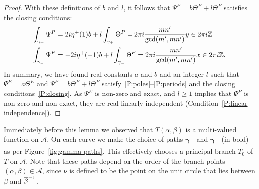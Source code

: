\documentclass{article}
\begin{document}
\begin{lem}
\begin{proof}
With these definitions of $b$ and $l$, it follows that $\Psi^P = b \Theta^E + l \Theta^P$ satisfies the closing conditions:
\begin{align*}
\int_{\gamma_+} \Psi^P
&= 2i \eta^+(1) b + l \int_{\gamma_+} \Theta^P
= 2\pi i \frac{mn'}{\gcd(m',mn')}y \in 2\pi i \mathbb{Z} \\
\int_{\gamma_-} \Psi^P
&= -2i \eta^+(-1) b + l \int_{\gamma_-} \Theta^P
= 2\pi i \frac{mn'}{\gcd(m',mn')}x \in 2\pi i \mathbb{Z}.
\end{align*}
In summary, we have found real constants $a$ and $b$ and an integer $l$ such that $\Psi^E = a\Theta^E$ and $\Psi^P = b\Theta^E + l\Theta^P$ satisfy~\ref{P:poles}--\ref{P:periods} and the closing conditions~\ref{P:closing}. As $\Psi^E$ is non-zero and exact, and $l\geq 1$ implies that $\Psi^P$ is non-zero and non-exact, they are real linearly independent (Condition~\ref{P:linear independence}).
\end{proof}
\end{lem}


Immediately before this lemma we observed that $T(\alpha,\beta)$ is a multi-valued function on $\mathcal{A}$. 
On each curve we make the choice of paths $\boldsymbol{\gamma}_+$ and $\boldsymbol{\gamma}_-$ (in bold) as per Figure~\ref{fig:gamma paths}. This effectively chooses a principal branch $T_0$ of $T$ on $\mathcal{A}$. Note that these paths depend on the order of the branch points $(\alpha,\beta) \in \mathcal{A}$, since $\nu$ is defined to be the point on the unit circle that lies between $\beta$ and $\overline{\beta}^{-1}$.
\end{document}
